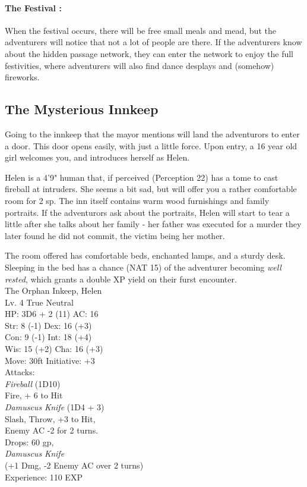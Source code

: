 \documentclass[10pt]{report}
\begin{document}
\paragraph{The Festival :} When the festival occurs, there will be free small meals and mead, but the adventurers will notice that not a lot of people are there. If the adventurers know about the hidden passage network, they can enter the network to enjoy the full festivities, where adventurers will also find dance desplays and (somehow) fireworks.

\subsection{The Mysterious Innkeep}
Going to the innkeep that the mayor mentions will land the adventurors to enter a door. This door opens easily, with just a little force. Upon entry, a 16 year old girl welcomes you, and introduces herself as Helen. \\

\begin{multicols}{2}
Helen is a 4'9" human that, if perceived (Perception 22) has a tome to cast fireball at intruders. She seems a bit sad, but will offer you a rather comfortable room for 2 sp. The inn itself contains warm wood furnishings and family portraits. If the adventurors ask about the portraits, Helen will start to tear a little after she talks about her family - her father was executed for a murder they later found he did not commit, the victim being her mother. 

The room offered has comfortable beds, enchanted lamps, and a sturdy desk. Sleeping in the bed has a chance (NAT 15) of the adventurer becoming \textit{well rested}, which grants a double XP yield on their furst encounter. \\

\columnbreak
The Orphan Inkeep, Helen \\
Lv. 4 True Neutral \\
HP: 3D6 + 2 (11) AC: 16 \\
Str: 8 (-1) Dex:  16 (+3) \\
Con: 9 (-1) Int: 18 (+4) \\
Wis: 15 (+2) Cha: 16 (+3) \\
Move: 30ft Initiative: +3 \\
Attacks: 
\medskip \\
\textit{Fireball} (1D10)  \\
Fire, + 6 to Hit 
\medskip \\
\textit{Damuscus Knife} (1D4 + 3) \\
Slash, Throw, +3 to Hit, \\
Enemy AC -2 for 2 turns. 
\medskip \\
Drops: 60 gp, 
\medskip \\
 \textit{Damuscus Knife}  \\
(+1 Dmg, -2 Enemy AC over 2 turns) 
\medskip \\
Experience: 110 EXP \\

\end{multicols}
\end{document}
